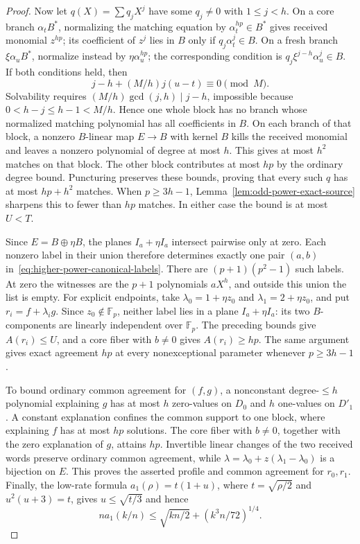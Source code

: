 \begin{proof}
Now let $q(X)=\sum q_jX^j$ have some $q_j\ne0$ with $1\le j<h$.
On a core branch $\alpha_t B^*$, normalizing the matching equation
by $\alpha_t^{hp}\in B^*$ gives received monomial $z^{hp}$;
its coefficient of $z^j$ lies in $B$ only if $q_j\alpha_t^j\in B$.
On a fresh branch $\xi\alpha_u B^*$, normalize instead by
$\eta\alpha_u^{hp}$; the corresponding condition is
$q_j\xi^{j-h}\alpha_u^j\in B$. If both conditions held, then
\[
 j-h+(M/h)j(u-t)\equiv0\pmod M.
\]
Solvability requires $(M/h)\gcd(j,h)\mid j-h$, impossible because
$0<h-j\le h-1<M/h$. Hence one whole block has no branch whose
normalized matching polynomial has all coefficients in $B$.
On each branch of that block, a nonzero $B$-linear map $E\to B$
with kernel $B$ kills the received monomial and leaves a nonzero
polynomial of degree at most $h$. This gives at most $h^2$ matches
on that block. The other block contributes at most $hp$ by the
ordinary degree bound. Puncturing preserves these bounds, proving
that every such $q$ has at most $hp+h^2$ matches. When $p\ge3h-1$,
Lemma~\ref{lem:odd-power-exact-source} sharpens this to fewer than $hp$
matches. In either case the bound is at most $U<T$.

Since $E=B\oplus\eta B$, the planes $I_a+\eta I_a$ intersect pairwise
only at zero. Each nonzero label in their union therefore determines
exactly one pair $(a,b)$ in~\eqref{eq:higher-power-canonical-labels}.
There are $(p+1)(p^2-1)$ such labels. At zero the witnesses are the
$p+1$ polynomials $aX^h$, and outside this union the list is empty.
For explicit endpoints, take $\lambda_0=1+\eta z_0$ and
$\lambda_1=2+\eta z_0$, and put $r_i=f+\lambda_i g$.
Since $z_0\notin\mathbb F_p$, neither label lies in a plane
$I_a+\eta I_a$: its two $B$-components are linearly independent
over $\mathbb F_p$. The preceding bounds give $A(r_i)\le U$,
and a core fiber with $b\ne0$ gives $A(r_i)\ge hp$.
The same argument gives exact agreement $hp$ at every nonexceptional
parameter whenever $p\ge3h-1$.

To bound ordinary common agreement for $(f,g)$, a nonconstant
degree-$\le h$ polynomial explaining $g$ has at most $h$ zero-values
on $D_0$ and $h$ one-values on $D'_1$. A constant explanation confines
the common support to one block, where explaining $f$ has at most
$hp$ solutions. The core fiber with $b\ne0$, together with the zero
explanation of $g$, attains $hp$. Invertible linear changes of the
two received words preserve ordinary common agreement, while
$\lambda=\lambda_0+z(\lambda_1-\lambda_0)$ is a bijection on $E$.
This proves the asserted profile and common agreement for $r_0,r_1$.
Finally, the low-rate formula $a_1(\rho)=t(1+u)$, where
$t=\sqrt{\rho/2}$ and $u^2(u+3)=t$, gives $u\le\sqrt{t/3}$ and hence
\[
 n a_1(k/n)\le\sqrt{kn/2}+(k^3n/72)^{1/4}.
\]
\end{proof}

